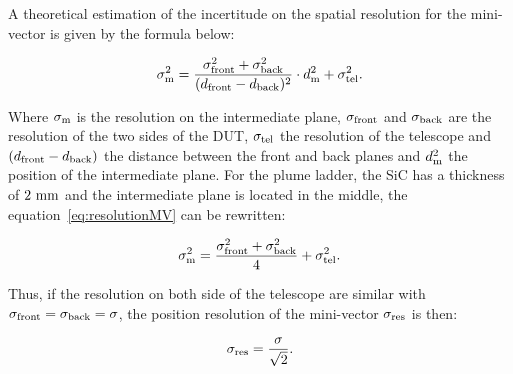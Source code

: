     A theoretical estimation of the incertitude on the spatial resolution for the mini-vector is given by the formula below:

    \begin{equation}
      \sigma_{\rm{m}}^2 = \frac{\sigma_{\rm{front}}^2 + \sigma_{\rm{back}}^2}{(d_{\rm{front}} - d_{\rm{back}})^2} \cdot d_{\rm{m}}^2 + \sigma_{\rm{tel}}^2.
      \label{eq:resolutionMV}
    \end{equation}

    Where $\sigma_{\rm{m}}$ is the resolution on the intermediate plane, $\sigma_{\rm{front}}$ and $\sigma_{\rm{back}}$ are the resolution of the two sides of the \gls{DUT}, $\sigma_{\rm{tel}}$ the resolution of the telescope and $(d_{\rm{front}} - d_{\rm{back}})$ the distance between the front and back planes and $d_{\rm{m}}^2$ the position of the intermediate plane.
    For the plume ladder, the \gls{SiC} has a thickness of $2~\rm{mm}$ and the intermediate plane is located in the middle, the equation~\ref{eq:resolutionMV} can be rewritten:

    \begin{equation}
      \sigma_{\rm{m}}^2 = \frac{\sigma_{\rm{front}}^2 + \sigma_{\rm{back}}^2}{4} + \sigma_{\rm{tel}}^2.
    \end{equation}

    Thus, if the resolution on both side of the telescope are similar with $\sigma_{\rm{front}} = \sigma_{\rm{back}} = \sigma$, the position resolution of the mini-vector $\sigma_{\rm{res}}$ is then:

    \begin{equation}
      \sigma_{\rm{res}} = \frac{\sigma}{\sqrt{2}}.
    \end{equation}

